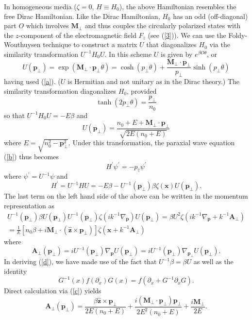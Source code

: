 \documentclass[aps,pra,preprint,superscriptaddress,showpacs,showkeys]{revtex4}
\begin{document}
In homogeneous media ($\zeta=0$, $H\equiv H_0$), the above Hamiltonian resembles the free Dirac Hamiltonian. Like the Dirac Hamiltonian, $H_0$ has an odd (off-diagonal) part $O$ which involves $\textbf{M}_\bot$ and thus couples the circularly polarized states with the $z$-component of the electromagnetic field $F_z$ (see (\ref{3})). We can use the Foldy-Wouthuysen technique to construct a matrix $U$ that diagonalizes $H_0$ via the similarity transformation $U^{-1}H_0U$. In this scheme $U$ is given by $e^{\beta O \theta}$, or
$$
U(\textbf{p}_\bot)=\exp (\textbf{M}_\bot\cdot\textbf{p}_\bot\theta)=\cosh(p_\bot\theta)+\frac{\textbf{M}_\bot\cdot \textbf{p}_\bot}{p_\bot}\sinh(p_\bot\theta)
$$
having used (\ref{a}). ($U$ is Hermitian and not unitary as in the Dirac theory.) The similarity transformation diagonalizes $H_0$, provided
$$
\tanh(2p_\bot\theta)=\frac{p_\bot}{n_0}
$$
so that $U^{-1}H_0U=-E\beta$ and
\begin{equation}
U(\textbf{p}_\bot)=\frac{n_0+E+\textbf{M}_\bot\cdot\textbf{p}_\bot}{\sqrt{2E(n_0+E)}} \label{c}
\end{equation}
where $E=\sqrt{n_0^2-\textbf{p}_\bot^2}$. Under this transformation, the paraxial wave equation (\ref{b}) thus becomes 
\begin{equation}
H^\prime\psi^\prime=-p_z\psi^\prime \label{ab}
\end{equation}
where $\psi^\prime=U^{-1}\psi$ and
$$
H^\prime=U^{-1}HU=-E\beta-U^{-1}(\textbf{p}_{\bot})\beta\zeta(\textbf{x})U(\textbf{p}_{\bot}).
$$
The last term on the left hand side of the above can be written in the momentum representation as
\begin{eqnarray}
U^{-1}(\textbf{p}_\bot)\beta U(\textbf{p}_\bot)U^{-1}(\textbf{p}_\bot)\zeta(ik^{-1}\nabla_{\textbf{p}})U(\textbf{p}_\bot)=
\beta U^2 \zeta(ik^{-1}\nabla_{\textbf{p}}+k^{-1}\textbf{A}_\bot) \nonumber \\
=\frac{1}{E}[n_0 \beta+i\textbf{M}_\bot \cdot (\hat{\textbf{z}} \times \textbf{p}_\bot)]\zeta(\textbf{x}+k^{-1}\textbf{A}_\bot) \label{d}
\end{eqnarray}
where
$$
\textbf{A}_\bot({\textbf{p}_\bot})=iU^{-1}(\textbf{p}_\bot)\nabla_\textbf{p}U(\textbf{p}_\bot)=iU^{-1}(\textbf{p}_\bot)\nabla_{\textbf{p}_\bot}U(\textbf{p}_\bot).
$$
In deriving (\ref{d}), we have made use of the fact that $U^{-1}\beta=\beta U$ as well as the identity
$$
G^{-1}(x)f(\partial_x)G(x)=f(\partial_x+G^{-1}\partial_x G).
$$  
Direct calculation via (\ref{c}) yields
$$
\textbf{A}_\bot({\textbf{p}_\bot})=\frac{\beta\hat{\textbf{z}}\times\textbf{p}_\bot}{2E(n_0+E)}+\frac{i(\textbf{M}_\bot\cdot\textbf{p}_\bot)\textbf{p}_\bot}{2E^2(n_0+E)}+\frac{i\textbf{M}_\bot}{2E} .
$$
\end{document}

